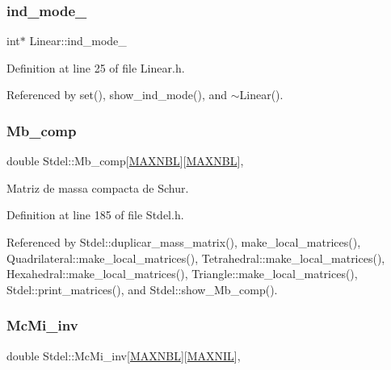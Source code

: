 \subsubsection{\texorpdfstring{ind\+\_\+mode\+\_\+}{ind\_mode\_}}
{\footnotesize\ttfamily int$\ast$ Linear\+::ind\+\_\+mode\+\_\+\hspace{0.3cm}{\ttfamily [private]}}



Definition at line 25 of file Linear.\+h.



Referenced by set(), show\+\_\+ind\+\_\+mode(), and $\sim$\+Linear().

\mbox{\label{classStdel_aa1627cb39fa5da75764809412159c825}} 
\subsubsection{\texorpdfstring{Mb\+\_\+comp}{Mb\_comp}}
{\footnotesize\ttfamily double Stdel\+::\+Mb\+\_\+comp\mbox{[}\hyperlink{MyOptions_8h_aed8828a63ec0a2a0461b7c9ed39dd648}{M\+A\+X\+N\+BL}\mbox{]}\mbox{[}\hyperlink{MyOptions_8h_aed8828a63ec0a2a0461b7c9ed39dd648}{M\+A\+X\+N\+BL}\mbox{]}\hspace{0.3cm}{\ttfamily [protected]}, {\ttfamily [inherited]}}



Matriz de massa compacta de Schur. 



Definition at line 185 of file Stdel.\+h.



Referenced by Stdel\+::duplicar\+\_\+mass\+\_\+matrix(), make\+\_\+local\+\_\+matrices(), Quadrilateral\+::make\+\_\+local\+\_\+matrices(), Tetrahedral\+::make\+\_\+local\+\_\+matrices(), Hexahedral\+::make\+\_\+local\+\_\+matrices(), Triangle\+::make\+\_\+local\+\_\+matrices(), Stdel\+::print\+\_\+matrices(), and Stdel\+::show\+\_\+\+Mb\+\_\+comp().

\mbox{\label{classStdel_acc685141e80bcce9703e37f32cc5c42c}} 
\subsubsection{\texorpdfstring{Mc\+Mi\+\_\+inv}{McMi\_inv}}
{\footnotesize\ttfamily double Stdel\+::\+Mc\+Mi\+\_\+inv\mbox{[}\hyperlink{MyOptions_8h_aed8828a63ec0a2a0461b7c9ed39dd648}{M\+A\+X\+N\+BL}\mbox{]}\mbox{[}\hyperlink{MyOptions_8h_a463cdf068fb6289d1f81dac7e0f76ab5}{M\+A\+X\+N\+IL}\mbox{]}\hspace{0.3cm}{\ttfamily [protected]}, {\ttfamily [inherited]}}



